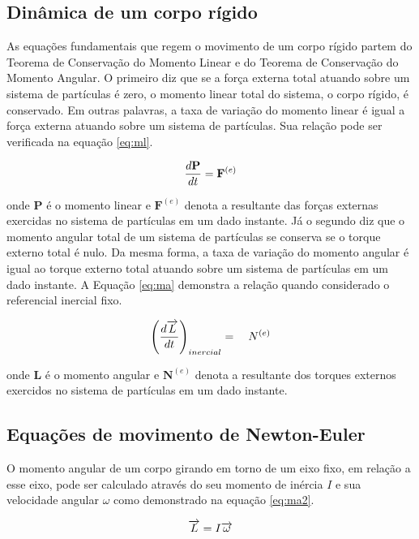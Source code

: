 \documentclass[a4paper, 12pt]{article}
\begin{document}
\subsection{Dinâmica de um corpo rígido}

As equações fundamentais que regem o movimento de um corpo rígido partem do Teorema de Conservação do Momento Linear e do Teorema de Conservação do Momento Angular. O primeiro diz que se a força externa total atuando sobre um sistema de partículas é zero, o momento linear total do sistema, o corpo rígido, é conservado. Em outras palavras, a taxa de variação do momento linear é igual a força externa atuando sobre um sistema de partículas. Sua relação pode ser verificada na equação \ref{eq:ml}.

\begin{equation}
\centering
\frac { d\mathbf{P} }{ dt } ={ \mathbf{F} }^{ (e) }
\label{eq:ml}
\end{equation}

\noindent onde $\mathbf{P}$ é o momento linear e ${ \mathbf{F} }^{ (e) }$ denota a resultante das forças externas exercidas no sistema de partículas em um dado instante. Já o segundo diz que o momento angular total de um sistema de partículas se conserva se o torque externo total é nulo. Da mesma forma, a taxa de variação do momento angular é igual ao torque externo total atuando sobre um sistema de partículas em um dado instante. A Equação \ref{eq:ma} demonstra a relação quando considerado o referencial inercial fixo.

\begin{equation}
\centering
{ \left( \frac { d\overrightarrow { L } }{ dt }  \right)  }_{ inercial }=\quad { N }^{ (e) }
\label{eq:ma}
\end{equation}

\noindent onde $\mathbf{L}$ é o momento angular e ${ \mathbf{N} }^{ (e) }$ denota a resultante dos torques externos exercidos no sistema de partículas em um dado instante. 

\subsection{Equações de movimento de Newton-Euler}

O momento angular de um corpo girando em torno de um eixo fixo, em relação a esse eixo, pode ser calculado através do seu momento de inércia $I$ e sua velocidade angular $\omega$ como demonstrado na equação \ref{eq:ma2}.


\begin{equation}
\centering
 \overrightarrow { L } =I\overrightarrow { \omega } 
\label{eq:ma2}
\end{equation}
\end{document}
